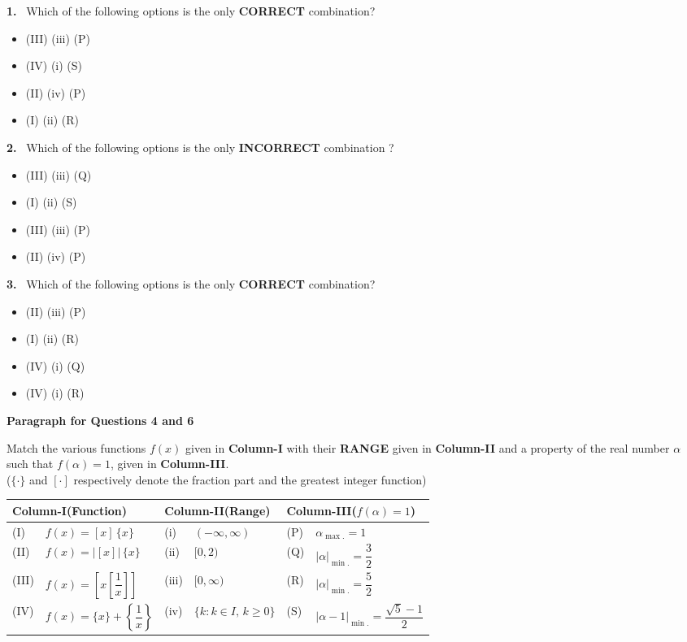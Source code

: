 \documentclass[10pt]{extarticle}
\newcommand{\qn}[1]{\par\smallskip\noindent\textbf{#1.}~}
\newcommand{\paraq}[2]{\par\smallskip\noindent\textbf{Paragraph for Questions #1 and #2}\par}
\newenvironment{qoptions}{\begin{itemize}[leftmargin=1.8em,itemsep=1pt,topsep=2pt,label={}]}{\end{itemize}}
\newcommand{\opt}[2]{\item[(#1)] #2}
\begin{document}
\begin{multicols}{2}
\qn{1} Which of the following options is the only \textbf{CORRECT} combination?
\begin{qoptions}
\opt{A}{(III) (iii) (P)}
\opt{B}{(IV) (i) (S)}
\opt{C}{(II) (iv) (P)}
\opt{D}{(I) (ii) (R)}
\end{qoptions}
\qn{2} Which of the following options is the only \textbf{INCORRECT} combination ?
\begin{qoptions}
\opt{A}{(III) (iii) (Q)}
\opt{B}{(I) (ii) (S)}
\opt{C}{(III) (iii) (P)}
\opt{D}{(II) (iv) (P)}
\end{qoptions}
\qn{3} Which of the following options is the only \textbf{CORRECT} combination?
\begin{qoptions}
\opt{A}{(II) (iii) (P)}
\opt{B}{(I) (ii) (R)}
\opt{C}{(IV) (i) (Q)}
\opt{D}{(IV) (i) (R)}
\end{qoptions}
\paraq{4}{6}
Match the various functions $f(x)$ given in \textbf{Column-I} with their \textbf{RANGE} given in \textbf{Column-II} and a property of the real number $\alpha$ such that $f(\alpha)=1$, given in \textbf{Column-III}.\\
($\{\cdot\}$ and $[\cdot]$ respectively denote the fraction part and the greatest integer function)
\end{multicols}
\begin{center}\small\setlength{\tabcolsep}{4pt}
\begin{tabular}{|p{0.9cm}|p{3.6cm}|p{0.9cm}|p{3.6cm}|p{0.9cm}|p{3.6cm}|}\hline
\multicolumn{2}{|p{\dimexpr 4.5cm+2\tabcolsep\relax}|}{\centering \textbf{Column-I}\newline\textbf{(Function)}} & \multicolumn{2}{p{\dimexpr 4.5cm+2\tabcolsep\relax}|}{\centering \textbf{Column-II}\newline\textbf{(Range)}} & \multicolumn{2}{p{\dimexpr 4.5cm+2\tabcolsep\relax}|}{\centering \textbf{Column-III}\newline\textbf{($f(\alpha)=1$)}}\\\hline
(I) & $f(x)=[x]\,\{x\}$ & (i) & $(-\infty,\infty)$ & (P) & $\alpha_{\max.}=1$\\\hline
(II) & $f(x)=\bigl|[x]\bigr|\,\{x\}$ & (ii) & $[0,2)$ & (Q) & $|\alpha|_{\min.}=\dfrac32$\\\hline
(III) & $f(x)=\left[x\left[\dfrac1x\right]\right]$ & (iii) & $[0,\infty)$ & (R) & $|\alpha|_{\min.}=\dfrac52$\\\hline
(IV) & $f(x)=\{x\}+\left\{\dfrac1x\right\}$ & (iv) & $\{k:k\in I,\,k\ge0\}$ & (S) & $|\alpha-1|_{\min.}=\dfrac{\sqrt5-1}2$\\\hline
\end{tabular}
\end{center}
\end{document}
